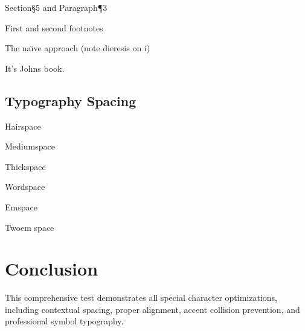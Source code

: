 \documentclass[11pt]{article}
\begin{document}
Section\S 5 and Paragraph\P 3

First\dag{} and second\ddag{} footnotes

The na\"\i ve approach (note dieresis on i)

It's John\apos{}s book.

\subsection{Typography Spacing}

Hair\thinspace space

Medium\medspace space

Thick\thickspace space

Word\wordspace space

Em\emspace space

Two\twoemspace em space

\section{Conclusion}

This comprehensive test demonstrates all special character optimizations, including contextual spacing, proper alignment, accent collision prevention, and professional symbol typography.
\end{document}
